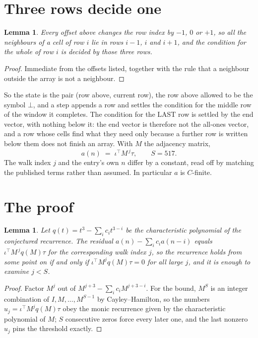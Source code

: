 \documentclass[11pt,a4paper]{article}
\theoremstyle{plain}
\newtheorem{lemma}[theorem]{Lemma}
\theoremstyle{definition}
\begin{document}
\section{Three rows decide one}

\begin{lemma}\label{lem:win}
Every offset above changes the row index by $-1$, $0$ or $+1$, so all the neighbours of a cell
of row $i$ lie in rows $i-1$, $i$ and $i+1$, and the condition for the whole of row $i$ is
decided by those three rows.
\end{lemma}

\begin{proof}
Immediate from the offsets listed, together with the rule that a neighbour outside the array is
not a neighbour.
\end{proof}

So the state is the pair (row above, current row), the row above allowed to be the symbol
$\bot$, and a step appends a row and settles the condition for the middle row of the window it
completes. The condition for the LAST row is settled by the end vector, with nothing below it:
the end vector is therefore not the all-ones vector, and a row whose cells find what they need
only because a further row is written below them does not finish an array. With $M$ the
adjacency matrix,
\[
a(n)\;=\;\iota^{\!\top}M^{\,j}\tau ,\qquad S=517.
\]
The walk index $j$ and the entry's own $n$ differ by a constant, read off by matching the
published terms rather than assumed. In particular $a$ is $C$-finite.

\section{The proof}

\begin{lemma}\label{lem:crit}
Let $q(t)=t^{3}-\sum_i c_it^{3-i}$ be the characteristic polynomial of the
conjectured recurrence. The residual $a(n)-\sum_ic_ia(n-i)$ equals
$\iota^{\!\top}M^{\,j}q(M)\tau$ for the corresponding walk index $j$, so the recurrence
holds from some point on if and only if $\iota^{\!\top}M^{j}q(M)\tau=0$ for all large $j$,
and it is enough to examine $j<S$.
\end{lemma}

\begin{proof}
Factor $M^{j}$ out of $M^{j+3}-\sum_ic_iM^{j+3-i}$. For the bound, $M^{S}$
is an integer combination of $I,M,\dots,M^{S-1}$ by Cayley--Hamilton, so the numbers
$u_j=\iota^{\!\top}M^{j}q(M)\tau$ obey the monic recurrence given by the characteristic
polynomial of $M$; $S$ consecutive zeros force every later one, and the last nonzero $u_j$
pins the threshold exactly.
\end{proof}
\end{document}
